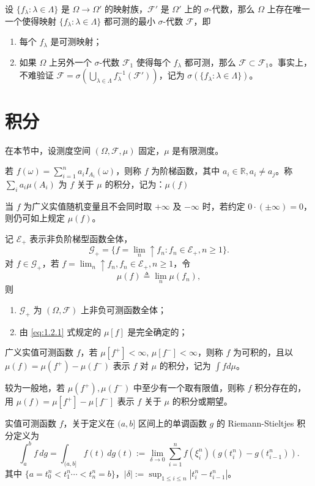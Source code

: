 \documentclass[lang=cn,10pt,thmcnt=section]{elegantbook}
\begin{document}
设 \(\{f_\lambda : \lambda \in \Lambda\}\) 是 \(\Omega \rightarrow \Omega'\) 的映射族，\(\mathcal{F}'\) 是 \(\Omega'\) 上的 \(\sigma\)-代数，那么 \(\Omega\) 上存在唯一一个使得映射 \(\{f_\lambda : \lambda \in \Lambda\}\) 都可测的最小 \(\sigma\)-代数 \(\mathcal{F}\)，即
\begin{enumerate}
    \item 每个 \(f_\lambda\) 是可测映射；
    \item 如果 \(\Omega\) 上另外一个 \(\sigma\)-代数 \(\mathcal{F}_1\) 使得每个 \(f_\lambda\) 都可测，那么 \(\mathcal{F} \subset \mathcal{F}_1\)。事实上，不难验证 \(\mathcal{F} = \sigma(\bigcup_{\lambda \in \Lambda} f_\lambda^{-1}(\mathcal{F}'))\)，记为 \(\sigma(\{f_\lambda : \lambda \in \Lambda\})\)。
\end{enumerate}
\section{积分}
在本节中，设测度空间 \((\Omega, \mathscr{F}, \mu)\) 固定，\(\mu\) 是有限测度。
\begin{definition}
	若 \(f(\omega) = \sum_{i=1}^{n} a_i I_{A_i}(\omega)\)，则称 \(f\) 为阶梯函数，其中 \(a_i \in \mathbb{R}, a_i \neq a_j\)。称 \(\sum_i a_i \mu(A_i)\) 为 \(f\) 关于 \(\mu\) 的积分，记为：\(\mu(f)\)
\end{definition}
\begin{remark}
	当 \(f\) 为广义实值随机变量且不会同时取 \(+\infty\) 及 \(-\infty\) 时，若约定 \(0 \cdot (\pm \infty) = 0\)，则仍可如上规定 \(\mu(f)\)。
\end{remark}
\begin{proposition}
	记 \(\mathscr{E}_+\) 表示非负阶梯型函数全体，
\[
\mathscr{G}_+ = \{f = \lim_n \uparrow f_n : f_n \in \mathscr{E}_+, n \geq 1\}.
\]
对 \(f \in \mathscr{G}_+\)，若 \(f = \lim_n \uparrow f_n, f_n \in \mathscr{E}_+, n \geq 1\)，令
\[
\mu(f) \triangleq \lim_n \mu(f_n), \tag{1.2.1}\label{eq:1.2.1}
\]
则
\begin{enumerate}
    \item \(\mathscr{G}_+\) 为 \((\Omega, \mathscr{F})\) 上非负可测函数全体；
    \item 由 \ref{eq:1.2.1} 式规定的 \(\mu[f]\) 是完全确定的；
\end{enumerate}
\end{proposition}
\begin{definition}
	广义实值可测函数 \(f\)，若 \(\mu[f^+] < \infty\), \(\mu[f^-] < \infty\)，则称 \(f\) 为可积的，且以 \(\mu(f) = \mu(f^+) - \mu(f^-)\) 表示 \(f\) 对 \(\mu\) 的积分，记为 \(\int f d\mu\)。

较为一般地，若 \(\mu(f^+), \mu(f^-)\) 中至少有一个取有限值，则称 \(f\) 积分存在的，用 \(\mu(f) = \mu[f^+] - \mu[f^-]\) 表示 \(f\) 关于 \(\mu\) 的积分或期望。
\end{definition}
\begin{definition}
	实值可测函数 \(f\)，关于定义在 \((a, b]\) 区间上的单调函数 \(g\) 的 Riemann-Stieltjes 积分定义为
\[
\int_a^b f \, dg = \int_{(a,b]} f(t) \, dg(t) := \lim_{\delta \to 0} \sum_{i=1}^n f(\xi_i^n) (g(t_i^n) - g(t_{i-1}^n)).
\]
其中 \(\{a = t_0^n < t_1^n \cdots < t_n^n = b\}\)，\(|\delta| := \sup_{1 \leq i \leq n} |t_i^n - t_{i-1}^n|\)。
\end{definition}
\end{document}
